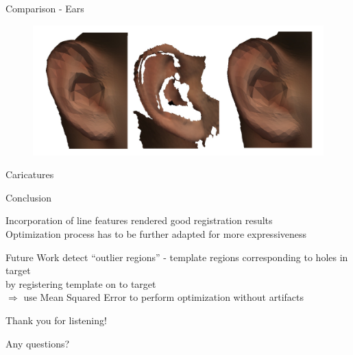 \documentclass[xcolor=x11names,compress]{beamer}
\begin{document}
\begin{frame}{Comparison - Ears}
    \begin{figure}
        \centering
        \includegraphics[width=.8\textwidth]{../resources/img/00029_left_ear_comparison.pdf}
    \end{figure}
\end{frame}

\begin{frame}{Caricatures}
\end{frame}

\begin{frame}{Conclusion}
    \begin{center}
    Incorporation of line features rendered good registration results\\
    \vfill  
    Optimization process has to be further adapted for more expressiveness\\
    \end{center}
\end{frame}

\begin{frame}{Future Work}
    detect ``outlier regions'' - template regions corresponding to holes in target\\
    by registering template on to target\\
    $\Rightarrow$ use Mean Squared Error to perform optimization without artifacts
\end{frame}
\begin{frame}{Thank you for listening!}
    \begin{center}
    \Large Any questions? 
    \end{center}
\end{frame}
\end{document}

